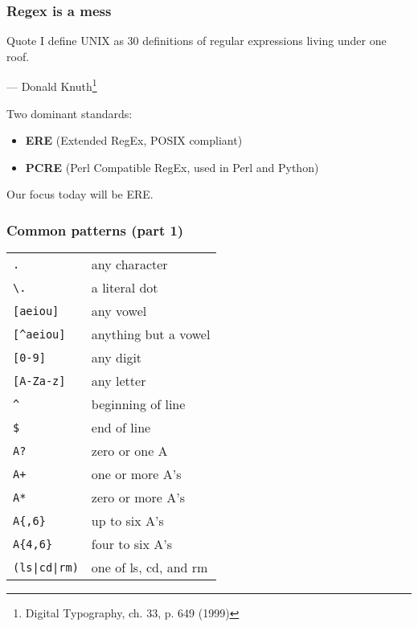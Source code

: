 \begin{frame}
\frametitle{Regex is a mess}
\begin{block}{Quote}
I define UNIX as 30 definitions of regular expressions living under one roof.
\begin{flushright}
    — Donald Knuth\footnote{Digital Typography, ch. 33, p. 649 (1999)}
\end{flushright}
\end{block}

Two dominant standards:
\begin{itemize}
    \item \textbf{ERE} (Extended RegEx, POSIX compliant)
    \item \textbf{PCRE} (Perl Compatible RegEx, used in Perl and Python)
\end{itemize}
Our focus today will be ERE.
\end{frame}

\begin{frame}[fragile]
\frametitle{Common patterns (part 1)}
\begin{table}
    \centering
    \begin{tabular}{ll}
        \verb|.|            & any character \\
        \verb|\.|           & a literal dot \\
        \verb|[aeiou]|      & any vowel \\
        \verb|[^aeiou]|     & anything but a vowel \\
        \verb|[0-9]|        & any digit \\
        \verb|[A-Za-z]|     & any letter \\
        \verb|^|            & beginning of line \\
        \verb|$|            & end of line \\
        \verb|A?|           & zero or one A \\
        \verb|A+|           & one or more A's \\
        \verb|A*|           & zero or more A's \\
        \verb|A{,6}|        & up to six A's \\
        \verb|A{4,6}|       & four to six A's \\
        \verb!(ls|cd|rm)!   & one of ls, cd, and rm
    \end{tabular}
\end{table}
\end{frame}

